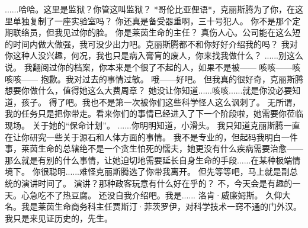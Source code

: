 \documentclass[openany]{book}
\begin{document}
\begin{dialogue}
     ......哈哈。这里是监狱？你管这叫监狱？
     *哥伦比亚俚语*，克丽斯腾为了你，在这里单独复制了一座实验室吗？
     你还真是备受器重啊，三十号犯人。
     你不是那个定期联络员，但我见过你的脸。
     你是莱茵生命的主任？
     真伤人心。公司能在这么短的时间内做大做强，我可没少出力吧。克丽斯腾都不和你好好介绍我的吗？
     我对你这种人没兴趣，何况，我也只是病入膏肓的废人，你来找我做什么？
     ......别这么说。
     我翻阅过你的档案，你本来是个很了不起的人，如果不是被——
     咳咳——咳咳咳——
     抱歉。我对过去的事情过敏。
     哦——好吧。
     但我真的很好奇，克丽斯腾想要你做什么，值得她这么大费周章？
     她没让你知道......咳咳......就是你没必要知道，孩子。
     得了吧。我也不是第一次被你们这些科学怪人这么讽刺了。
     无所谓，我的任务只是把你带走。看来你们的事情已经进入了下一个阶段啦，她需要你莅临现场。
     关于她的“保命计划”。
     ......你明明知道，小滑头。
     我只知道克丽斯腾一直在让你研究一些关于源石和人体方面的事情。
     我不是专业的，但起码我明白一件事，莱茵生命的总辖绝不是一个贪生怕死的懦夫，她更没有什么疾病需要治愈——
     那么就是有别的什么事情，让她迫切地需要延长自身生命的手段......在某种极端情境下。
     你很聪明......难怪克丽斯腾选了你带我离开。
     但先等等吧，马上就是副总统的演讲时间了。
     演讲？那种政客玩意有什么好在乎的？
     不，今天会是有趣的一天。心急吃不了热豆腐。
     还没自我介绍吧。我是......
     洛肯·威廉姆斯。
     久仰大名。我是莱茵生命商务科主任贾斯汀·菲茨罗伊，对科学技术一窍不通的门外汉。
     我只是来见证历史的，先生。
\end{dialogue}
\end{document}
